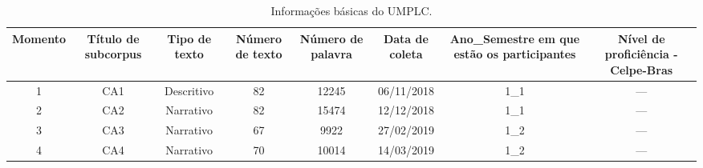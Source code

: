 \documentclass[portuguese]{textolivre}
\begin{document}
\begin{table}[h]
\footnotesize
\begin{threeparttable}
\caption{Informações básicas do UMPLC.}
\label{Tab2}
\begin{tabular}{cccccccc}
\toprule
Momento             & 
\multicolumn{1}{p{1.4cm}}{Título de subcorpus} & 
\multicolumn{1}{p{1.4cm}}{Tipo de texto} & 
\multicolumn{1}{p{1.4cm}}{Número de texto} & 
\multicolumn{1}{p{1.4cm}}{Número de palavra} & 
\multicolumn{1}{p{1.4cm}}{Data de coleta} & 
\multicolumn{1}{p{1.4cm}}{Ano\_Se\-mes\-tre em que estão os participantes} & 
\multicolumn{1}{p{1.4cm}}{Nível de proficiência - Celpe-Bras} \\ 
\midrule
1                   & CA1                                                               & Descritivo                                                  & 82                                                            & 12245                                                           & 06/11/2018                                                   & 1\_1                                                                                      & ---                                                                           \\
2                   & CA2                                                               & Narrativo                                                   & 82                                                            & 15474                                                           & 12/12/2018                                                   & 1\_1                                                                                      & ---                                                                           \\
3                   & CA3                                                               & Narrativo                                                   & 67                                                            & 9922                                                            & 27/02/2019                                                   & 1\_2                                                                                      & ---                                                                           \\
4                   & CA4                                                               & Narrativo                                                   & 70                                                            & 10014                                                           & 14/03/2019                                                   & 1\_2                                                                                      & ---                                                                           \\

\end{tabular}
\end{threeparttable}
\end{table}
\end{document}
